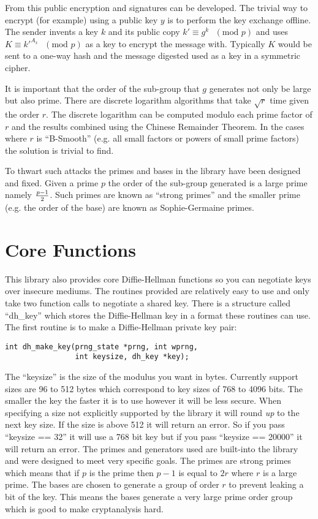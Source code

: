 \documentclass{book}
\begin{document}
From this public encryption and signatures can be developed.  The trivial way to encrypt (for example) using a public key 
$y$ is to perform the key exchange offline.  The sender invents a key $k$ and its public copy 
$k' \equiv g^k\mbox{ }(\mbox{mod }p)$ and uses $K \equiv k'^{A_x}\mbox{ }(\mbox{mod }p)$ as a key to encrypt
the message with.  Typically $K$ would be sent to a one-way hash and the message digested used as a key in a 
symmetric cipher.

It is important that the order of the sub-group that $g$ generates not only be large but also prime.  There are
discrete logarithm algorithms that take $\sqrt r$ time given the order $r$.  The discrete logarithm can be computed
modulo each prime factor of $r$ and the results combined using the Chinese Remainder Theorem.  In the cases where 
$r$ is ``B-Smooth'' (e.g. all small factors or powers of small prime factors) the solution is trivial to find.

To thwart such attacks the primes and bases in the library have been designed and fixed.  Given a prime $p$ the order of
 the sub-group generated is a large prime namely ${p - 1} \over 2$.  Such primes are known as ``strong primes'' and the 
smaller prime (e.g. the order of the base) are known as Sophie-Germaine primes.

\section{Core Functions}

This library also provides core Diffie-Hellman functions so you can negotiate keys over insecure mediums.  The routines 
provided are relatively easy to use and only take two function calls to negotiate a shared key.  There is a structure
called ``dh\_key'' which stores the Diffie-Hellman key in a format these routines can use.  The first routine is to
make a Diffie-Hellman private key pair:
\begin{verbatim}
int dh_make_key(prng_state *prng, int wprng, 
                int keysize, dh_key *key);
\end{verbatim}
The ``keysize'' is the size of the modulus you want in bytes.  Currently support sizes are 96 to 512 bytes which correspond 
to key sizes of 768 to 4096 bits. The smaller the key the faster it is to use however it will be less secure.  When 
specifying a size not explicitly supported by the library it will round {\em up} to the next key size.  If the size is 
above 512 it will return an error.  So if you pass ``keysize == 32'' it will use a 768 bit key but if you pass 
``keysize == 20000'' it will return an error.  The primes and generators used are built-into the library and were designed 
to meet very specific goals.  The primes are strong primes which means that if $p$ is the prime then
$p-1$ is equal to $2r$ where $r$ is a large prime.  The bases are chosen to generate a group of order $r$ to prevent
leaking a bit of the key.  This means the bases generate a very large prime order group which is good to make cryptanalysis
hard.
\end{document}
